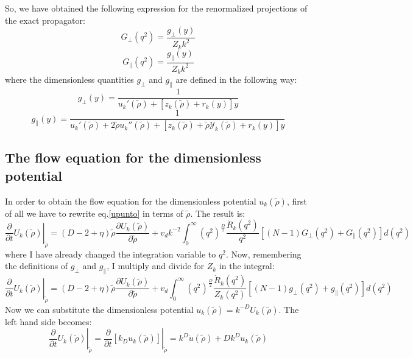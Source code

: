 So, we have obtained the following expression for the renormalized projections of the exact propagator:
\begin{equation}
 G_\perp(q^2) = \frac{g_\perp(y)}{Z_kk^2}
\end{equation}
\begin{equation}
 G_\parallel(q^2) = \frac{g_\parallel(y)}{Z_kk^2}
\end{equation}
where the dimensionless quantities $g_\perp$ and $g_\parallel$ are defined in the following way:
$$g_\perp(y) = \frac{1}{u_k'(\widetilde{\rho}) + [z_k(\widetilde{\rho}) + r_k(y)]y}$$
$$g_\parallel(y) = \frac{1}{u_k'(\widetilde{\rho}) + 2\widetilde{\rho}u_k''(\widetilde{\rho})+ [z_k(\widetilde{\rho}) + \widetilde{\rho}\mathcal{Y}_k(\widetilde{\rho})+ r_k(y)]y}$$

\subsection{The flow equation for the dimensionless potential}
In order to obtain the flow equation for the dimensionless potential $u_k(\widetilde{\rho})$, first of all we have to rewrite eq.\eqref{upunto} in terms of $\widetilde{\rho}$.
The result is:
\begin{equation}
\left.\frac{\partial}{\partial t} U_k(\widetilde{\rho})\right|_{\widetilde{\rho}} = (D - 2 + \eta)\widetilde{\rho}\frac{\partial U_k(\widetilde{\rho})}{\partial \widetilde{\rho}} + v_dk^{-2} \int_0^\infty (q^2)^{\frac{D}{2}}  \frac{\dot{R}_k(q^2)}{q^2} \left[(N-1)G_\perp(q^2)  + G_\parallel(q^2)\right] d(q^2)
\end{equation}
where I have already changed the integration variable to $q^2$. Now, remembering the definitions of $g_\perp$ and $g_\parallel$, I multiply and divide for $Z_k$ in the integral:
\begin{equation}
\left.\frac{\partial}{\partial t} U_k(\widetilde{\rho})\right|_{\widetilde{\rho}} = (D - 2 + \eta)\widetilde{\rho}\frac{\partial U_k(\widetilde{\rho})}{\partial \widetilde{\rho}} + v_d \int_0^\infty (q^2)^{\frac{D}{2}}  \frac{\dot{R}_k(q^2)}{Z_k (q^2)} \left[ (N-1)g_\perp(q^2)  + g_\parallel(q^2)\right] d(q^2)
\end{equation}
Now we can substitute the dimensionless potential $u_k(\widetilde{\rho}) = k^{-D}U_k(\widetilde{\rho})$. The left hand side becomes:
\begin{equation}
\left.\frac{\partial}{\partial t} U_k(\widetilde{\rho})\right|_{\widetilde{\rho}} = \left.\frac{\partial}{\partial t} [k_Du_k(\widetilde{\rho})]\right|_{\widetilde{\rho}} = k^D\dot{u}(\widetilde{\rho}) + D k^D u_k(\widetilde{\rho})
\end{equation}
